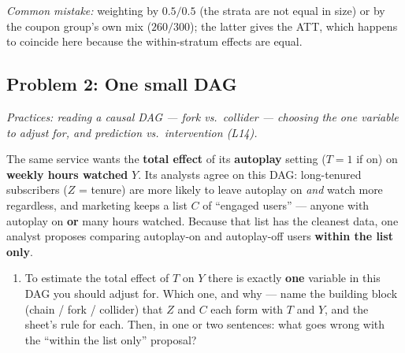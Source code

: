 \documentclass[
  11pt,
]{article}
\providecommand{\tightlist}{%
  \setlength{\itemsep}{0pt}\setlength{\parskip}{0pt}}
\newcommand{\answerpage}{\clearpage}
\begin{document}
\begin{solutionbox}
\emph{Common mistake:} weighting by \(0.5/0.5\) (the strata are not
equal in size) or by the coupon group's own mix (\(260/300\)); the
latter gives the ATT, which happens to coincide here because the
within-stratum effects are equal.

\end{solutionbox}

\answerpage

\subsection{Problem 2: One small DAG}\label{problem-2-one-small-dag}

\emph{Practices: reading a causal DAG --- fork vs.~collider --- choosing
the one variable to adjust for, and prediction vs.~intervention (L14).}

The same service wants the \textbf{total effect} of its
\textbf{autoplay} setting (\(T=1\) if on) on \textbf{weekly hours
watched} \(Y\). Its analysts agree on this DAG: long-tenured subscribers
(\(Z\) = tenure) are more likely to leave autoplay on \emph{and} watch
more regardless, and marketing keeps a list \(C\) of ``engaged users''
--- anyone with autoplay on \textbf{or} many hours watched. Because that
list has the cleanest data, one analyst proposes comparing autoplay-on
and autoplay-off users \textbf{within the list only}.

\begin{center}
\end{center}

\begin{enumerate}
\def\labelenumi{(\alph{enumi})}
\tightlist
\item
  To estimate the total effect of \(T\) on \(Y\) there is exactly
  \textbf{one} variable in this DAG you should adjust for. Which one,
  and why --- name the building block (chain / fork / collider) that
  \(Z\) and \(C\) each form with \(T\) and \(Y\), and the sheet's rule
  for each. Then, in one or two sentences: what goes wrong with the
  ``within the list only'' proposal?
\end{enumerate}
\end{document}
